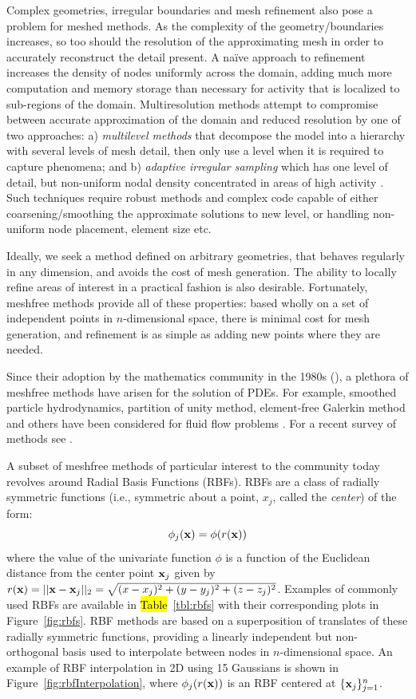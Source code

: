Complex geometries, irregular boundaries and mesh refinement also pose a problem for meshed methods. As the complexity of 
the geometry/boundaries increases, so too should the resolution of the approximating mesh in order to 
accurately reconstruct the detail present. A na\"{i}ve approach to refinement increases the density of nodes uniformly across the 
domain, adding much more computation and memory storage than necessary for activity that is localized to sub-regions 
of the domain. Multiresolution methods attempt to compromise between accurate approximation of the domain and 
reduced resolution by one of two approaches: a) \emph{multilevel methods} that decompose the model into a hierarchy with 
several levels of mesh detail, then only use a level when it is required to capture phenomena; and b) \emph{adaptive irregular 
sampling} which has one level of detail, but non-uniform nodal density concentrated in areas of high activity \cite
{Iske2004}. Such techniques require robust methods and complex code capable of either coarsening/smoothing the 
approximate solutions to new level, or handling non-uniform node placement, element size etc. 

Ideally, we seek a method defined on arbitrary geometries, that behaves regularly in any dimension, and avoids the cost of 
mesh generation. The ability to locally refine areas of interest in a practical fashion is also desirable. Fortunately, meshfree 
methods provide all of these properties: based wholly on a set of independent points in $n$-dimensional space, 
there is minimal cost for mesh generation, and refinement is as simple as adding new points where 
they are needed. 

Since their adoption by the mathematics community in the 1980s (\cite{Fasshauer2007}), a plethora of meshfree methods have 
arisen for the solution of PDEs. For example, smoothed particle hydrodynamics, partition of unity method, element-free Galerkin 
method and others have been considered for fluid flow problems \cite{Chandhini2007}. For a recent survey of methods see \cite{Li2007}.


A subset of meshfree methods of particular interest to the
community today revolves around Radial Basis Functions (RBFs).
RBFs are a class of radially symmetric functions (i.e.,
symmetric about a point, $x_j$, called the \emph{center}) of the
form: 
	\begin{equation} 
		\phi_j(\mathbf{x}) = \phi(r(\mathbf{x}))
	\end{equation} 
where the value of the univariate function $\phi$ is a
function of the Euclidean distance from the center point $\mathbf{x}_j$ given by
$r(\mathbf{x}) = ||\mathbf{x}-\mathbf{x}_j||_2 = \sqrt{(x-x_j)^2 + (y-y_j)^2 + (z-z_j)^2}$. Examples of
commonly used RBFs are available in \hl{Table}~\ref{tbl:rbfs}
with their corresponding plots in Figure~\ref{fig:rbfs}. RBF
methods are based on a superposition of translates of these
radially symmetric functions, providing a linearly independent
but non-orthogonal basis used to interpolate between nodes in
$n$-dimensional space. An example of RBF interpolation in 2D
using 15 Gaussians is shown in
Figure~\ref{fig:rbfInterpolation}, where $\phi_j(r(\mathbf{x}))$ is an
RBF centered at $\{\mathbf{x}_j\}_{j=1}^{n}$.


